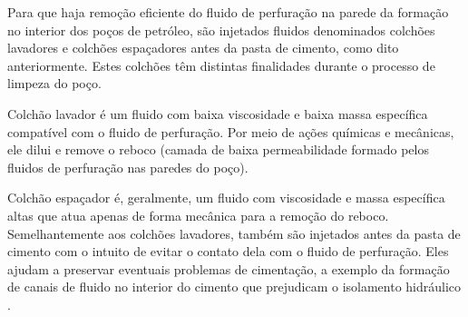 Para que haja remoção eficiente do fluido de perfuração na parede da formação no interior dos poços de petróleo, são injetados fluidos denominados colchões lavadores e colchões espaçadores antes da pasta de cimento, como dito anteriormente. Estes colchões têm distintas finalidades durante o processo de limpeza do poço.
			
Colchão lavador é um fluido com baixa viscosidade e baixa massa específica compatível com o fluido de perfuração. Por meio de ações químicas e mecânicas, ele dilui e remove o reboco (camada de baixa permeabilidade formado pelos fluidos de perfuração nas paredes do poço).

Colchão espaçador é, geralmente, um fluido com viscosidade e massa específica altas que atua apenas de forma mecânica para a remoção do reboco. Semelhantemente aos colchões lavadores, também são injetados antes da pasta de cimento com o intuito de evitar o contato dela com o fluido de perfuração. Eles ajudam a preservar eventuais problemas de cimentação, a exemplo da formação de canais de fluido no interior do cimento que prejudicam o isolamento hidráulico \cite{Campos}.
			

